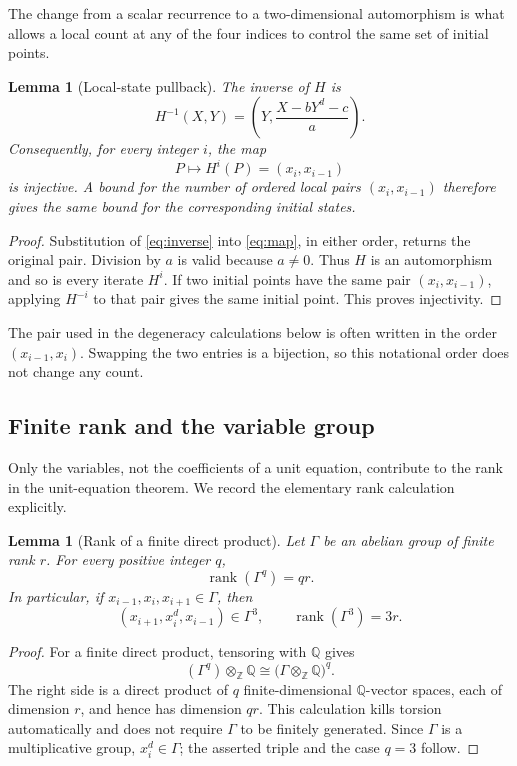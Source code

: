 \documentclass[11pt]{article}
\newtheorem{lemma}[theorem]{Lemma}
\theoremstyle{definition}
\theoremstyle{remark}
\begin{document}
The change from a scalar recurrence to a two-dimensional automorphism is
what allows a local count at any of the four indices to control the same set
of initial points.

\begin{lemma}[Local-state pullback]\label{lem:local-pullback}
The inverse of \(H\) is
\begin{equation}\label{eq:inverse}
 H^{-1}(X,Y)
 =
 \left(Y,\frac{X-bY^d-c}{a}\right).
\end{equation}
Consequently, for every integer \(i\), the map
\[
 P\longmapsto H^i(P)=(x_i,x_{i-1})
\]
is injective.  A bound for the number of ordered local pairs
\((x_i,x_{i-1})\) therefore gives the same bound for the corresponding
initial states.
\end{lemma}

\begin{proof}
Substitution of \eqref{eq:inverse} into \eqref{eq:map}, in either order,
returns the original pair.  Division by \(a\) is valid because \(a\ne0\).
Thus \(H\) is an automorphism and so is every iterate \(H^i\).  If two
initial points have the same pair \((x_i,x_{i-1})\), applying \(H^{-i}\) to
that pair gives the same initial point.  This proves injectivity.
\end{proof}

The pair used in the degeneracy calculations below is often written in the
order \((x_{i-1},x_i)\).  Swapping the two entries is a bijection, so this
notational order does not change any count.

\subsection{Finite rank and the variable group}

Only the variables, not the coefficients of a unit equation, contribute to
the rank in the unit-equation theorem.  We record the elementary rank
calculation explicitly.

\begin{lemma}[Rank of a finite direct product]\label{lem:product-rank}
Let \(\Gamma\) be an abelian group of finite rank \(r\).  For every positive
integer \(q\),
\[
 \operatorname{rank}(\Gamma^q)=qr.
\]
In particular, if \(x_{i-1},x_i,x_{i+1}\in\Gamma\), then
\[
 (x_{i+1},x_i^d,x_{i-1})\in\Gamma^3,
 \qquad
 \operatorname{rank}(\Gamma^3)=3r.
\]
\end{lemma}

\begin{proof}
For a finite direct product, tensoring with \(\mathbb Q\) gives
\[
 (\Gamma^q)\otimes_{\mathbb Z}\mathbb Q
 \cong
 \bigl(\Gamma\otimes_{\mathbb Z}\mathbb Q\bigr)^q.
\]
The right side is a direct product of \(q\) finite-dimensional
\(\mathbb Q\)-vector spaces, each of dimension \(r\), and hence has
dimension \(qr\).  This calculation kills torsion automatically and does
not require \(\Gamma\) to be finitely generated.  Since \(\Gamma\) is a
multiplicative group, \(x_i^d\in\Gamma\); the asserted triple and the case
\(q=3\) follow.
\end{proof}
\end{document}
